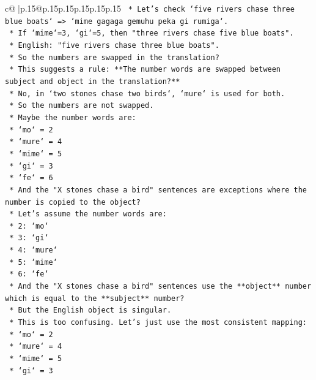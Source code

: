 \documentclass{article}
\begin{document}
{\begin{supertabular}{c@{$\;$}|p{.15\linewidth}@{}p{.15\linewidth}p{.15\linewidth}p{.15\linewidth}p{.15\linewidth}p{.15\linewidth}}
{{{\texttt{    *   Let's check `five rivers chase three blue boats` => `mime gagaga gemuhu peka gi rumiga`.} \\
\texttt{    *   If `mime`=3, `gi`=5, then "three rivers chase five blue boats".} \\
\texttt{    *   English: "five rivers chase three blue boats".} \\
\texttt{    *   So the numbers are swapped in the translation?} \\
\texttt{    *   This suggests a rule: **The number words are swapped between subject and object in the translation?**} \\
\texttt{    *   No, in `two stones chase two birds`, `mure` is used for both.} \\
\texttt{    *   So the numbers are not swapped.} \\
\texttt{    *   Maybe the number words are:} \\
\texttt{        *   `mo` = 2} \\
\texttt{        *   `mure` = 4} \\
\texttt{        *   `mime` = 5} \\
\texttt{        *   `gi` = 3} \\
\texttt{        *   `fe` = 6} \\
\texttt{    *   And the "X stones chase a bird" sentences are exceptions where the number is copied to the object?} \\
\texttt{    *   Let's assume the number words are:} \\
\texttt{        *   2: `mo`} \\
\texttt{        *   3: `gi`} \\
\texttt{        *   4: `mure`} \\
\texttt{        *   5: `mime`} \\
\texttt{        *   6: `fe`} \\
\texttt{    *   And the "X stones chase a bird" sentences use the **object** number which is equal to the **subject** number?} \\
\texttt{    *   But the English object is singular.} \\
\texttt{    *   This is too confusing. Let's just use the most consistent mapping:} \\
\texttt{        *   `mo` = 2} \\
\texttt{        *   `mure` = 4} \\
\texttt{        *   `mime` = 5} \\
\texttt{        *   `gi` = 3} \\
}}}
\end{supertabular}}
\end{document}
